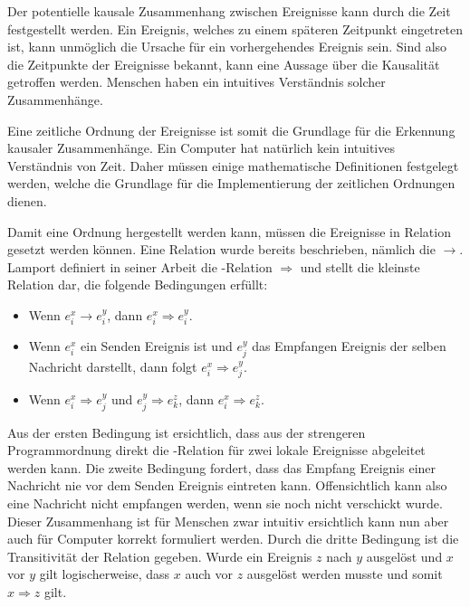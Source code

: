 
Der potentielle kausale Zusammenhang zwischen Ereignisse kann durch die Zeit festgestellt werden.
Ein Ereignis, welches zu einem späteren Zeitpunkt eingetreten ist, kann unmöglich die Ursache für ein vorhergehendes Ereignis sein.
Sind also die Zeitpunkte der Ereignisse bekannt, kann eine Aussage über die Kausalität getroffen werden.
Menschen haben ein intuitives Verständnis solcher Zusammenhänge.

Eine zeitliche Ordnung der Ereignisse ist somit die Grundlage für die Erkennung kausaler Zusammenhänge.
Ein Computer hat natürlich kein intuitives Verständnis von Zeit.
Daher müssen einige mathematische Definitionen festgelegt werden, welche die Grundlage für die Implementierung der zeitlichen Ordnungen dienen.

Damit eine Ordnung hergestellt werden kann, müssen die Ereignisse in Relation gesetzt werden können.
Eine Relation wurde bereits beschrieben, nämlich die  $\rightarrow$.
Lamport \cite{Lamport1978} definiert in seiner Arbeit die -Relation $\Rightarrow$ und stellt die kleinste Relation dar, die folgende Bedingungen erfüllt:
\begin{itemize}
    \item Wenn $e_i^x \rightarrow e_i^y$, dann $e_i^x \Rightarrow e_i^y$.
    \item Wenn $e_i^x$ ein Senden Ereignis ist und $e_j^y$ das Empfangen Ereignis der selben Nachricht darstellt, dann folgt $e_i^x \Rightarrow e_j^y$.
    \item Wenn $e_i^x \Rightarrow e_j^y$ und $e_j^y \Rightarrow e_k^z$, dann $e_i^x \Rightarrow e_k^z$.
\end{itemize}

Aus der ersten Bedingung ist ersichtlich, dass aus der strengeren Programmordnung direkt die -Relation für zwei lokale Ereignisse abgeleitet werden kann.
Die zweite Bedingung fordert, dass das Empfang Ereignis einer Nachricht nie vor dem Senden Ereignis eintreten kann.
Offensichtlich kann also eine Nachricht nicht empfangen werden, wenn sie noch nicht verschickt wurde.
Dieser Zusammenhang ist für Menschen zwar intuitiv ersichtlich kann nun aber auch für Computer korrekt formuliert werden.
Durch die dritte Bedingung ist die Transitivität der Relation gegeben.
Wurde ein Ereignis $z$ nach $y$ ausgelöst und $x$ vor $y$ gilt logischerweise, dass $x$ auch vor $z$ ausgelöst werden musste und somit $x\Rightarrow z$ gilt.

